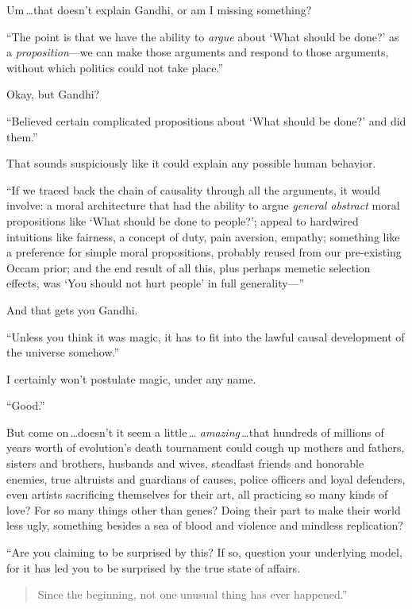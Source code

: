  Um\,\ldots that doesn't explain Gandhi, or am I
missing something?


 ``The point is that we have the ability to
\textit{argue} about `What should be
done?' as a \textit{proposition}{}---we can make those
arguments and respond to those arguments, without which politics could
not take place.''


 Okay, but Gandhi?


 ``Believed certain complicated propositions about
`What should be done?' and did
them.''


 That sounds suspiciously like it could explain any possible human
behavior.


 ``If we traced back the chain of causality
through all the arguments, it would involve: a moral architecture that
had the ability to argue \textit{general abstract} moral propositions
like `What should be done to people?';
appeal to hardwired intuitions like fairness, a concept of duty, pain
aversion, empathy; something like a preference for simple moral
propositions, probably reused from our pre-existing Occam prior; and
the end result of all this, plus perhaps memetic selection effects, was
`You should not hurt people' in full
generality---''


 And that gets you Gandhi.


 ``Unless you think it was magic, it has to fit
into the lawful causal development of the universe
somehow.''


 I certainly won't postulate magic, under any
name.


 ``Good.''


 But come on\,\ldots doesn't it seem a little\,\ldots
\textit{amazing}\,\ldots that hundreds of millions of years worth of
evolution's death tournament could cough up mothers and
fathers, sisters and brothers, husbands and wives, steadfast friends
and honorable enemies, true altruists and guardians of causes, police
officers and loyal defenders, even artists sacrificing themselves for
their art, all practicing so many kinds of love? For so many things
other than genes? Doing their part to make their world less ugly,
something besides a sea of blood and violence and mindless
replication?


 ``Are you claiming to be surprised by this? If
so, question your underlying model, for it has led you to be surprised
by the true state of affairs.

\begin{quote}
{
 Since the beginning,\newline
 not one unusual thing\newline
 has ever happened.''}
\end{quote}


